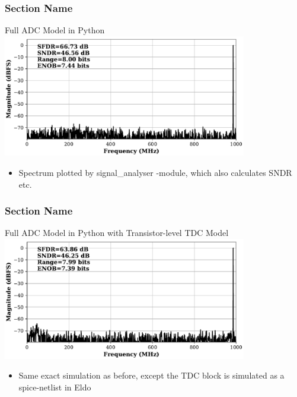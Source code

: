\documentclass[logo=bluequo,normaltitle]{aaltoslides}
\newcommand{\sectname}{Section Name}
\begin{document}
\begin{frame}[c]
    \frametitle{\sectname}
    \centering
    Full ADC Model in Python
    \includegraphics[width=0.8\textwidth]{Pics/latido_fft_py}
    \begin{itemize}
        \item Spectrum plotted by signal\_analyser -module, which also
            calculates SNDR etc.
    \end{itemize}
\end{frame}

\begin{frame}[c]
    \frametitle{\sectname}
    \centering
    Full ADC Model in Python with Transistor-level TDC Model
    \includegraphics[width=0.8\textwidth]{Pics/latido_fft_eldo}
    \begin{itemize}
        \item Same exact simulation as before, except the TDC block is
            simulated as a spice-netlist in Eldo
    \end{itemize}
\end{frame}

\renewcommand{\sectionname}{Example 4: Multi-user MIMO receiver}
\end{document}
